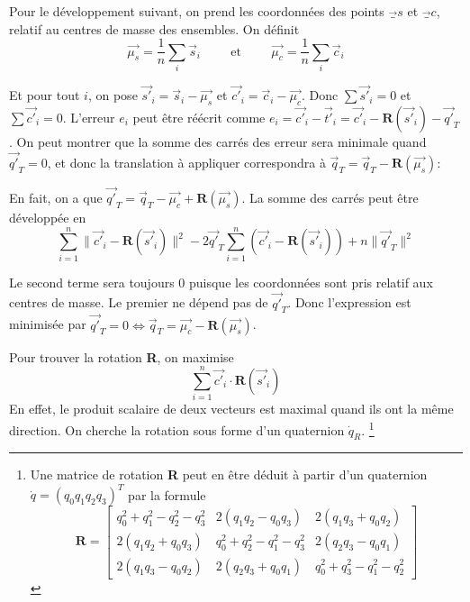 \documentclass[a4paper,10pt]{scrreprt}
\begin{document}
Pour le développement suivant, on prend les coordonnées des points $\vec_{s}$ et $\vec_{c}$, relatif au centres de masse des ensembles. On définit
\begin{equation}
	\vec{\mu_s} = \frac{1}{n} \sum_{i} \vec{s}_i
	\hspace{1cm} \text{et} \hspace{1cm}
	\vec{\mu_c} = \frac{1}{n} \sum_{i} \vec{c}_i
\end{equation}

Et pour tout $i$, on pose $\vec{s'}_i = \vec{s}_i - \vec{\mu_s}$ et $\vec{c'}_i = \vec{c}_i - \vec{\mu_c}$. Donc $\sum \vec{s'}_i = 0$ et $\sum \vec{c'}_i = 0$. L'erreur $e_i$ peut être réécrit comme $e_i = \vec{c'}_i - \vec{t'}_i = \vec{c'}_i - \mathbf{R}(\vec{s'}_i) - \vec{q'}_T$. On peut montrer que la somme des carrés des erreur sera minimale quand $\vec{q'}_T = 0$, et donc la translation à appliquer correspondra à $\vec{q}_T = \vec{q}_T - \mathbf{R}(\vec{\mu_s})$:

En fait, on a que $\vec{q'}_T = \vec{q}_T - \vec{\mu_c} + \mathbf{R}(\vec{\mu_s})$. La somme des carrés peut être développée en
\begin{equation}
	\sum_{i=1}^{n} \| \vec{c'}_i - \mathbf{R}(\vec{s'}_i) \|^2 - 2 \vec{q'}_T \sum_{i=1}^{n} (\vec{c'}_i - \mathbf{R}(\vec{s'}_i)) + n \|\vec{q'}_T\|^2
\end{equation}

Le second terme sera toujours $0$ puisque les coordonnées sont pris relatif aux centres de masse. Le premier ne dépend pas de $\vec{q'}_T$. Donc l'expression est minimisée par $\vec{q'}_T = 0 \iff \vec{q}_T = \vec{\mu_c} - \mathbf{R}(\vec{\mu_s})$.

Pour trouver la rotation \textbf{R}, on maximise
\begin{equation}
	\sum_{i=1}^{n} \vec{c'}_{i} \cdot \mathbf{R}(\vec{s'}_i)
\end{equation}
En effet, le produit scalaire de deux vecteurs est maximal quand ils ont la même direction. On cherche la rotation sous forme d'un quaternion $\dot{q}_R$.
\footnote{Une matrice de rotation \textbf{R} peut en être déduit à partir d'un quaternion $\dot{q} = (q_0 q_1 q_2 q_3)^T$ par la formule
\begin{equation}
	\mathbf{R} = \begin{bmatrix}
		q_0^2 + q_1^2 - q_2^2 - q_3^2 & 2(q_1 q_2 - q_0 q_3) & 2(q_1 q_3 + q_0 q_2) \\
		2(q_1 q_2 + q_0 q_3) & q_0^2 + q_2^2 - q_1^2 - q_3^2 & 2(q_2 q_3 - q_0 q_1) \\
		2(q_1 q_3 - q_0 q_2) & 2(q_2 q_3 + q_0 q_1) & q_0^2 + q_3^2 - q_1^2 - q_2^2
	\end{bmatrix}
\end{equation}}
\end{document}
